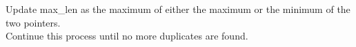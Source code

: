 \documentclass[preview]{standalone}
\begin{document}
Update max_len as the maximum of either the maximum or the minimum of the two pointers.\\Continue this process until no more duplicates are found.\\
\end{document}
